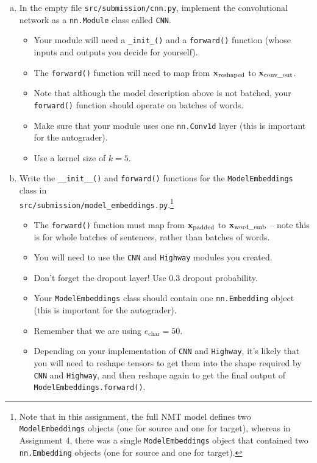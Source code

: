 \begin{enumerate}[(a)]
    \item \label{qn:cnn}
    In the empty file \texttt{src/submission/cnn.py}, implement the convolutional network as a \texttt{nn.Module} class called \texttt{CNN}.
    \begin{itemize}
        \item Your module will need a \texttt{\_init\_()} and a \texttt{forward()} function (whose inputs and outputs you decide for yourself).
        \item The \texttt{forward()} function will need to map from $\mathbf{x}_\text{reshaped}$ to $\mathbf{x}_\text{conv\_out}$.
        \item Note that although the model description above is not batched, your \texttt{forward()} function should operate on batches of words.
        \item Make sure that your module uses one \texttt{nn.Conv1d} layer (this is important for the autograder).
        \item Use a kernel size of $k=5$.
    \end{itemize}

    \item {} Write the \texttt{\_\_init\_\_()} and \texttt{forward()} functions for the \texttt{ModelEmbeddings} class in \\
    \texttt{src/submission/model\_embeddings.py}.\footnote{Note that in this assignment, the full NMT model defines two \texttt{ModelEmbeddings} objects (one for source and one for target), whereas in Assignment 4, there was a single \texttt{ModelEmbeddings} object that contained two \texttt{nn.Embedding} objects (one for source and one for target).} 
    \begin{itemize}
        \item The \texttt{forward()} function must map from $\mathbf{x}_\text{padded}$ to $\mathbf{x}_\text{word\_emb}$ -- note this is for whole batches of sentences, rather than batches of words.
        \item You will need to use the \texttt{CNN} and \texttt{Highway} modules you created.
        \item Don't forget the dropout layer! Use 0.3 dropout probability.
        \item Your \texttt{ModelEmbeddings} class should contain one \texttt{nn.Embedding} object (this is important for the autograder).
        \item Remember that we are using $e_\text{char}=50$.
        \item Depending on your implementation of \texttt{CNN} and \texttt{Highway}, it's likely that you will need to reshape tensors to get them into the shape required by \texttt{CNN} and \texttt{Highway}, and then reshape again to get the final output of \texttt{ModelEmbeddings.forward()}.
    \end{itemize}
    

\end{enumerate}

